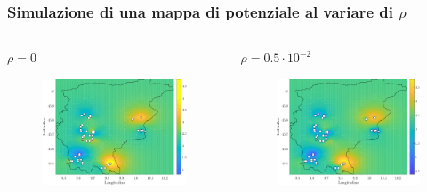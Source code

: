 \begin{frame}
	\frametitle{Simulazione di una mappa di potenziale al variare di $\rho$}
	
	\begin{columns}[T]
		\begin{column}[t]{0.48\linewidth}
			\centering
			$\rho = 0$
			\begin{figure}
				\includegraphics[width=\textwidth]{../Tesi/Immagini/2. Nuovo modello/Mappa potenziale, rho = 0}
			\end{figure}
		\end{column}
		\begin{column}[t]{0.48\linewidth}
			\centering
			$\rho = 0.5\cdot 10^{-2}$
			\begin{figure}
				\includegraphics[width=\textwidth]{../Tesi/Immagini/2. Nuovo modello/Mappa potenziale, rho = 0.005}
			\end{figure}
		\end{column}
	\end{columns}

\end{frame}

